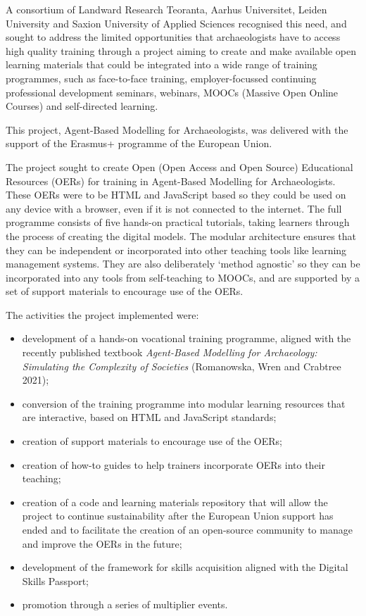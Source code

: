 \documentclass[
]{article}
\begin{document}
A consortium of Landward Research Teoranta, Aarhus Universitet, Leiden University and Saxion University of Applied Sciences recognised this need, and sought to address the limited opportunities that archaeologists have to access high quality training through a project aiming to create and make available open learning materials that could be integrated into a wide range of training programmes, such as face-to-face training, employer-focussed continuing professional development seminars, webinars, MOOCs (Massive Open Online Courses) and self-directed learning.

This project, Agent-Based Modelling for Archaeologists, was delivered with the support of the Erasmus+ programme of the European Union.

The project sought to create Open (Open Access and Open Source) Educational Resources (OERs) for training in Agent-Based Modelling for Archaeologists. These OERs were to be HTML and JavaScript based so they could be used on any device with a browser, even if it is not connected to the internet. The full programme consists of five hands-on practical tutorials, taking learners through the process of creating the digital models. The modular architecture ensures that they can be independent or incorporated into other teaching tools like learning management systems. They are also deliberately `method agnostic' so they can be incorporated into any tools from self-teaching to MOOCs, and are supported by a set of support materials to encourage use of the OERs.

The activities the project implemented were:

\begin{itemize}
\item
  development of a hands-on vocational training programme, aligned with the recently published textbook \emph{Agent-Based Modelling for Archaeology: Simulating the Complexity of Societies} (Romanowska, Wren and Crabtree 2021);
\item
  conversion of the training programme into modular learning resources that are interactive, based on HTML and JavaScript standards;
\item
  creation of support materials to encourage use of the OERs;
\item
  creation of how-to guides to help trainers incorporate OERs into their teaching;
\item
  creation of a code and learning materials repository that will allow the project to continue sustainability after the European Union support has ended and to facilitate the creation of an open-source community to manage and improve the OERs in the future;
\item
  development of the framework for skills acquisition aligned with the Digital Skills Passport;
\item
  promotion through a series of multiplier events.
\end{itemize}
\end{document}
